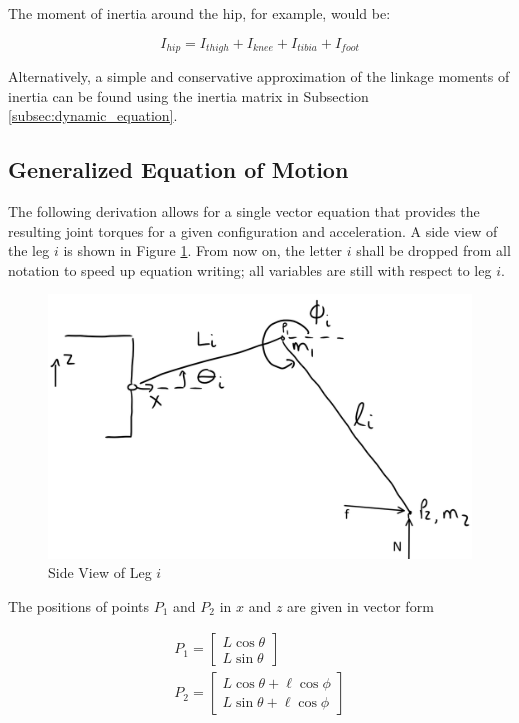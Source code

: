 The moment of inertia around the hip, for example, would be:

\begin{equation}
    I_{hip} = I_{thigh} + I_{knee} + I_{tibia} + I_{foot}
\end{equation}

Alternatively, a simple and conservative approximation of the linkage moments of inertia can be found using the inertia matrix in Subsection \ref{subsec:dynamic_equation}.



\subsection{Generalized Equation of Motion} \label{app:dynamic_equation}

The following derivation allows for a single vector equation that provides the resulting joint torques for a given configuration and acceleration.
A side view of the leg $i$ is shown in Figure \ref{fig:dynamic_leg_app}.
From now on, the letter $i$ shall be dropped from all notation to speed up equation writing; all variables are still with respect to leg $i$.

\begin{figure}[H]
    \centering
    \includegraphics[width=\textwidth]{5_KinematicAndForces/img/dynamic_leg.png}
    \caption{Side View of Leg $i$}
    \label{fig:dynamic_leg_app}
\end{figure}

The positions of points $P_1$ and $P_2$ in $x$ and $z$ are given in vector form

\begin{gather}
    P_1 = \begin{bmatrix} L \cos \theta \\ L \sin \theta \end{bmatrix}
    \\
    P_2 = \begin{bmatrix} L \cos \theta + \ell \cos \phi \\ L \sin \theta + \ell \cos \phi \end{bmatrix}
\end{gather}


